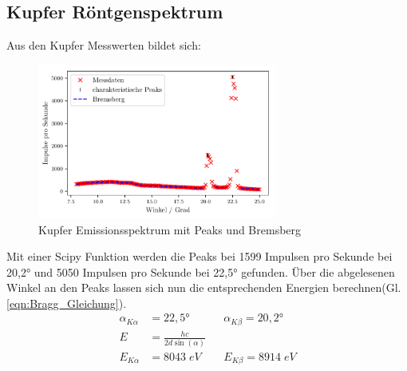 \subsection{Kupfer Röntgenspektrum}
Aus den Kupfer Messwerten bildet sich:
\begin{figure}[H]
    \centering
    \includegraphics[width=0.7\textwidth]{plots/CU_Spektrum.pdf}
    \caption{Kupfer Emissionsspektrum mit Peaks und Bremsberg}
    \label{fig:CU_Spektrum}
\end{figure}
Mit einer Scipy Funktion werden die Peaks bei 1599 Impulsen pro Sekunde bei 20,2° und 5050 Impulsen pro Sekunde bei 22,5° gefunden.
Über die abgelesenen Winkel an den Peaks lassen sich nun die entsprechenden Energien berechnen(Gl. \ref{eqn:Bragg_Gleichung}).
\begin{align*}
    \alpha_{K\alpha} &= 22,5° &&   \alpha_{K\beta} = 20,2° \\
    E &= \frac{hc}{2d\sin(\alpha)} \\
    E_{K\alpha} &= 8043 \; eV && E_{K\beta} = 8914\; eV \label{eqn:Energien_Spektrum}
\end{align*}


